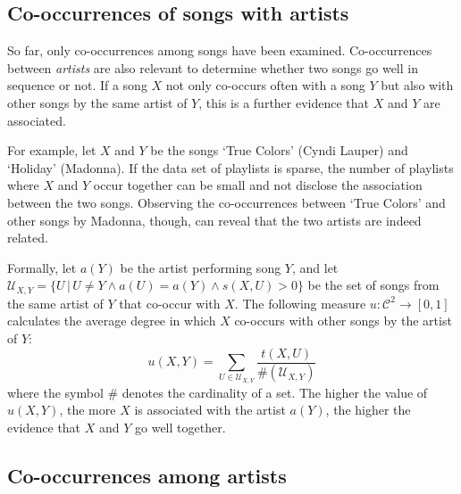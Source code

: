 

\subsection{Co-occurrences of songs with artists} %
\label{sub:expanding_to_artists}

So far, only co-occurrences among songs have been examined.
Co-occurrences between \emph{artists} are also relevant to determine whether two songs go well in sequence or not.
If a song $X$ not only co-occurs often with a song $Y$ but also with other songs by the same artist of $Y$, this is a further evidence that $X$ and $Y$ are associated.

For example, let $X$ and $Y$ be the songs `True Colors' (Cyndi Lauper) and `Holiday' (Madonna). 
If the data set of playlists is sparse, the number of playlists where $X$ and $Y$ occur together can be small and not disclose the association between the two songs. 
Observing the co-occurrences between `True Colors' and other songs by Madonna, though, can reveal that the two artists are indeed related. %

Formally, let $a(Y)$ be the artist performing song $Y$, and let $\mathcal{U}_{X,Y} = \{U\,|\,U \neq Y \wedge a(U) = a(Y) \wedge s(X,U) > 0 \}$ be the set of songs from the same artist of $Y$ that co-occur with $X$.
The following measure $u: \mathcal{C}^2 \to [0,1]$ calculates the average degree in which $X$ co-occurs with other songs by the artist of $Y$:
\begin{equation}\label{eq:song_to_artist}
	u(X,Y) = \sum_{U \in \mathcal{U}_{X,Y}}\frac{t(X,U)}{\#(\mathcal{U}_{X,Y})}
\end{equation}
where the symbol $\#$ denotes the cardinality of a set.
The higher the value of $u(X,Y)$, the more $X$ is associated with the artist $a(Y)$, the higher the evidence that $X$ and $Y$ go well together. 


\subsection{Co-occurrences among artists} %
\label{sub:considering_occurrences_among_artists}

